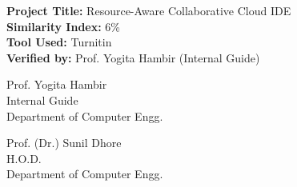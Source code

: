 \documentclass[12pt,a4paper]{report}
\begin{document}
\textbf{Project Title:} Resource-Aware Collaborative Cloud IDE \\
\textbf{Similarity Index:} 6\% \\
\textbf{Tool Used:} Turnitin \\
\textbf{Verified by:} Prof. Yogita Hambir (Internal Guide)

\vfill
\noindent
\begin{minipage}[t]{0.48\textwidth}
    Prof. Yogita Hambir \\
    Internal Guide \\
    Department of Computer Engg.
\end{minipage}
\hfill
\begin{minipage}[t]{0.48\textwidth}
    \raggedleft
    Prof. (Dr.) Sunil Dhore \\
    H.O.D. \\
    Department of Computer Engg.
\end{minipage}
\vspace{0.8cm}
\end{document}

